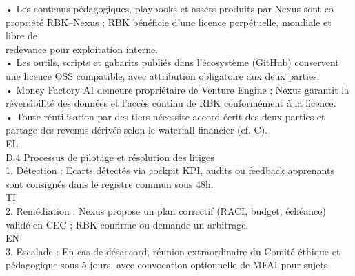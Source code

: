 \vspace{0.5em}
\vspace{0.5em}
\vspace{0.5em}
• Les contenus pédagogiques, playbooks et assets produits par Nexus sont co-propriété RBK–Nexus ; RBK bénéficie d’une licence perpétuelle, mondiale et libre de\\
redevance pour exploitation interne.\\
\vspace{0.5em}
• Les outils, scripts et gabarits publiés dans l’écosystème (GitHub) conservent une licence OSS compatible, avec attribution obligatoire aux deux parties.\\
\vspace{0.5em}
• Money Factory AI demeure propriétaire de Venture Engine ; Nexus garantit la réversibilité des données et l’accès continu de RBK conformément à la licence.\\
\vspace{0.5em}
• Toute réutilisation par des tiers nécessite accord écrit des deux parties et partage des revenus dérivés selon le waterfall financier (cf. C).\\
\vspace{0.5em}
\vspace{0.5em}
\vspace{0.5em}
\vspace{0.5em}
EL\\
D.4 Processus de pilotage et résolution des litiges\\
1. Détection : Ecarts détectés via cockpit KPI, audits ou feedback apprenants sont consignés dans le registre commun sous 48h.\\
\vspace{0.5em}
\vspace{0.5em}
\vspace{0.5em}
\vspace{0.5em}
TI\\
2. Remédiation : Nexus propose un plan correctif (RACI, budget, échéance) validé en CEC ; RBK confirme ou demande un arbitrage.\\
\vspace{0.5em}
\vspace{0.5em}
\vspace{0.5em}
\vspace{0.5em}
EN\\
3. Escalade : En cas de désaccord, réunion extraordinaire du Comité éthique et pédagogique sous 5 jours, avec convocation optionnelle de MFAI pour sujets\\
